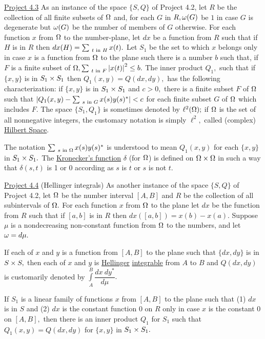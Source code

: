 \ul{Project 4.3}  As an instance of the space $\{S,Q\}$ of Project 4.2, let $R$ be the collection of all finite subsets of $\Omega$ and, for each $G$ in $R, \omega(G)$ be $1$ in case $G$ is degenerate but $\omega(G)$ be the number of members of $G$ otherwise.   For each function $x$ from $\Omega$ to the number-plane, let $dx$ be a function from $R$ such that if $H$ is in $R$ then $dx(H) = \sum_{~t\text{~in~}H} x(t).$   Let $S_{1}$ be the set to which $x$ belongs only in case $x$ is a function from $\Omega$ to the plane such there is a number $b$ such that, if $F$ is a finite subset of $\Omega, \sum_{~t\text{~in~}F}\left|x(t)\right|^{2} \leq b.$  The inner product $Q_{1},$ such that if $\{x,y\}$ is in $S_{1} \times S_{1}$ then $Q_{1}(x,y) = Q(dx,dy),$ has the following characterization:  if $\{x,y\}$ is in $S_{1} \times S_{1}$ and $c > 0,$ there is a finite subset $F$ of $\Omega$ such that $\left|Q_{1}(x,y) - \sum_{~s\text{~in~}G}x(s)y(s)^{*}\right| < c$ for each finite subset $G$ of $\Omega$ which includes $F.$  The space $\{S_{1},Q_{1}\}$ is sometimes denoted by $\ell^{2}(\Omega);$  if $\Omega$ is the set of all nonnegative integers, the customary notation is simply $\ell^{2},$ called (complex) \ul{Hilbert Space}.\nl

The notation $\sum_{~s\text{~in~}\Omega}x(s)y(s)^{*}$ is understood to mean $Q_{1}(x,y)$ for each $\{x,y\}$ in $S_{1} \times S_{1}.$  The \ul{Kronecker's function} $\delta$ (for $\Omega$) is defined on $\Omega\times \Omega$ in such a way that $\delta(s,t)$ is 1 or 0 according as $s$ is $t$ or $s$ is not $t.$\nl

\ul{Project 4.4}  (Hellinger integrals)  As another instance of the space $\{S,Q\}$ of Project 4.2, let $\Omega$
be the number interval $[A,B]$ and $R$ be the collection of all subintervals of $\Omega.$ For each function $x$ from $\Omega$ to the plane let $dx$ be the function from $R$ such that if $[a,b]$ is in $R$ then $dx([a,b]) = x(b) - x(a).$  Suppose $\mu$ is a nondecreasing non-constant function from $\Omega$ to the numbers, and let $\omega = d\mu.$\nl

If each of $x$ and $y$ is a function from $[A,B]$ to the plane such that $\{dx,dy\}$ is in $S \times S,$ then each of $x$ and $y$ is \ul{Hellinger} \ul{integrable} from $A$ to $B$ and $Q(dx,dy)$ is customarily denoted by
$\int\limits_{A}^{B}\dfrac{dx~dy^{*}}{d\mu}.$\nl

If $S_{1}$ is a linear family of functions $x$ from $[A,B]$ to the plane such that
(1) $dx$ is in $S$ and
(2) $dx$ is the constant function $0$ on $R$ only in case $x$ is the constant $0$ on $[A,B],$ then there is an inner product $Q_{1}$ for $S_{1}$ such that $Q_{1}(x,y) = Q(dx,dy)$ for $\{x,y\}$ in $S_{1} \times S_{1}.$\nl

